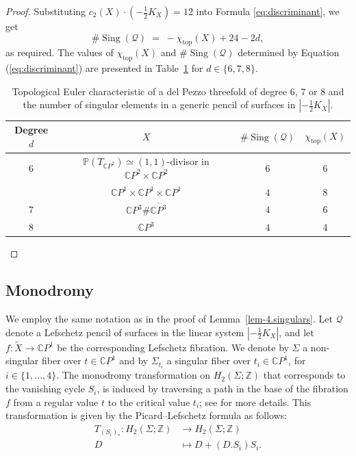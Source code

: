 \documentclass[11pt]{amsart}
\numberwithin{equation}{section}
\theoremstyle{definition}
\theoremstyle{plain}
\theoremstyle{remark}
\newcommand{\C}{\mathbb{C}}
\DeclareMathOperator{\Sing}{Sing}
\newcommand{\lra}{\longrightarrow}
\begin{document}
\begin{proof}
Substituting $c_2(X)\cdot (-\frac{1}{2}K_X)=12$ into Formula \eqref{eq:discriminant}, we get
\[
\#\Sing(\mathcal{Q})\;=\;-\chi_\mathrm{top}(X)+24-2d,
\]
as required.
The values of $\chi_\mathrm{top}(X)$ and $\#\Sing(\mathcal{Q})$ determined by Equation (\ref{eq:discriminant}) are presented in Table~\ref{Tab:singular.surfaces} for $d\in \{6,7,8\}$.
\begin{table}[h]
\centering\renewcommand{\arraystretch}{1.2}
\begin{tabular}{|c|c|c|c|}
\hline
Degree $d$ & \emph{$X$} & $\#\Sing(\mathcal{Q})$ & $\chi_\mathrm{top}(X)$ \\
\hline
$6$ & $\mathbb{P}(T_{\mathbb{C}P^2}) \simeq (1,1)$-divisor in $\mathbb{C}P^2 \times \mathbb{C}P^2$ & $6$ & $6$ \\
    &$\mathbb{C}P^1 \times \mathbb{C}P^1 \times \mathbb{C}P^1$  & $4$ & $8$ \\
\hline
$7$ & $\mathbb{C}P^3\#\overline{\mathbb{C}P^3}$ & $4$ & $6$ \\
\hline
$8$ & $\mathbb{C}P^3$ & $4$ & $4$ \\
\hline
\end{tabular}
\caption{Topological Euler characteristic of a del Pezzo threefold of degree  $6$, $7$ or $8$ and the number of singular elements in a generic pencil of surfaces in $|-\frac{1}{2}K_X|$.} \label{Tab:singular.surfaces}
\end{table}
\end{proof}

\subsection{Monodromy} \label{Sect-Monodromy}
We employ the same notation as in the proof of Lemma~\ref{lem-4.singulars}. Let $\mathcal{Q}$ denote a Lefschetz pencil of surfaces in the linear system $|-\frac{1}{2}K_X|$, and let $f\colon \tilde{X} \to \mathbb{C}P^1$ be the corresponding Lefschetz fibration. We denote by $\Sigma$ a non-singular fiber over $t\in \C P^1$ and by $\Sigma_{t_i}$ a singular fiber over $t_i\in \C P^1$, for $i\in \{1,\ldots,4\}$. The monodromy transformation on $H_2(\Sigma; \mathbb{Z})$ that corresponds to the vanishing cycle $S_i$, is induced by traversing a path in the base of the fibration $f$ from a regular value $t$ to the critical value $t_i$; see \cite[Section 2.2.2]{nguyen2022real} for more details. This transformation is given by the Picard--Lefschetz formula as follows:
 \begin{align*}
     T_{(S_i)_*}\colon  H_2(\Sigma;\mathbb{Z})&\lra H_2(\Sigma;\mathbb{Z})\\
   D&\longmapsto D+(D.S_i)S_i.
 \end{align*}
\end{document}
